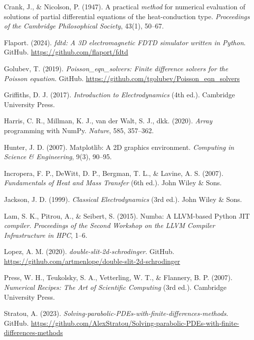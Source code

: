 \documentclass[11pt,a4paper]{article}
\begin{document}
\begingroup
\setlength{\parindent}{0pt}
\setlength{\parskip}{4pt}
\hangindent=0.7cm Crank, J., \& Nicolson, P. (1947). A practical \textit{method} for numerical evaluation of solutions of partial differential equations of the heat-conduction type. \textit{Proceedings of the Cambridge Philosophical Society}, 43(1), 50--67.\par
\hangindent=0.7cm Flaport. (2024). \textit{fdtd: A 3D electromagnetic FDTD simulator written in Python}. GitHub. \url{https://github.com/flaport/fdtd}\par
\hangindent=0.7cm Golubev, T. (2019). \textit{Poisson\_eqn\_solvers: Finite difference solvers for the Poisson equation}. GitHub. \url{https://github.com/tgolubev/Poisson_eqn_solvers}\par
\hangindent=0.7cm Griffiths, D. J. (2017). \textit{Introduction to Electrodynamics} (4th ed.). Cambridge University Press.\par
\hangindent=0.7cm Harris, C. R., Millman, K. J., van der Walt, S. J., dkk. (2020). \textit{Array} programming with NumPy. \textit{Nature}, 585, 357--362.\par
\hangindent=0.7cm Hunter, J. D. (2007). Matplotlib: A 2D graphics environment. \textit{Computing in Science \& Engineering}, 9(3), 90--95.\par
\hangindent=0.7cm Incropera, F. P., DeWitt, D. P., Bergman, T. L., \& Lavine, A. S. (2007). \textit{Fundamentals of Heat and Mass Transfer} (6th ed.). John Wiley \& Sons.\par
\hangindent=0.7cm Jackson, J. D. (1999). \textit{Classical Electrodynamics} (3rd ed.). John Wiley \& Sons.\par
\hangindent=0.7cm Lam, S. K., Pitrou, A., \& Seibert, S. (2015). Numba: A LLVM-based Python JIT \textit{compiler}. \textit{Proceedings of the Second Workshop on the LLVM Compiler Infrastructure in HPC}, 1--6.\par
\hangindent=0.7cm Lopez, A. M. (2020). \textit{double-slit-2d-schrodinger}. GitHub. \url{https://github.com/artmenlope/double-slit-2d-schrodinger}\par
\hangindent=0.7cm Press, W. H., Teukolsky, S. A., Vetterling, W. T., \& Flannery, B. P. (2007). \textit{Numerical Recipes: The Art of Scientific Computing} (3rd ed.). Cambridge University Press.\par
\hangindent=0.7cm Stratou, A. (2023). \textit{Solving-parabolic-PDEs-with-finite-differences-methods}. GitHub. \url{https://github.com/AlexStratou/Solving-parabolic-PDEs-with-finite-differences-methods}\par
\end{document}
